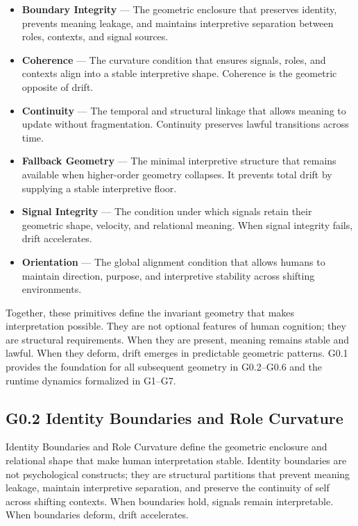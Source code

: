 \begin{itemize}[leftmargin=1.2cm]
    \item \textbf{Boundary Integrity} — The geometric enclosure that preserves
    identity, prevents meaning leakage, and maintains interpretive separation
    between roles, contexts, and signal sources.

    \item \textbf{Coherence} — The curvature condition that ensures signals,
    roles, and contexts align into a stable interpretive shape. Coherence is the
    geometric opposite of drift.

    \item \textbf{Continuity} — The temporal and structural linkage that allows
    meaning to update without fragmentation. Continuity preserves lawful
    transitions across time.

    \item \textbf{Fallback Geometry} — The minimal interpretive structure that
    remains available when higher-order geometry collapses. It prevents total
    drift by supplying a stable interpretive floor.

    \item \textbf{Signal Integrity} — The condition under which signals retain
    their geometric shape, velocity, and relational meaning. When signal
    integrity fails, drift accelerates.

    \item \textbf{Orientation} — The global alignment condition that allows
    humans to maintain direction, purpose, and interpretive stability across
    shifting environments.
\end{itemize}

\medskip

\noindent Together, these primitives define the invariant geometry that makes
interpretation possible. They are not optional features of human cognition; they
are structural requirements. When they are present, meaning remains stable and
lawful. When they deform, drift emerges in predictable geometric patterns. G0.1
provides the foundation for all subsequent geometry in G0.2--G0.6 and the
runtime dynamics formalized in G1--G7.


\subsection*{G0.2 Identity Boundaries and Role Curvature}
\medskip

\noindent Identity Boundaries and Role Curvature define the geometric enclosure
and relational shape that make human interpretation stable. Identity boundaries
are not psychological constructs; they are structural partitions that prevent
meaning leakage, maintain interpretive separation, and preserve the continuity
of self across shifting contexts. When boundaries hold, signals remain
interpretable. When boundaries deform, drift accelerates.

